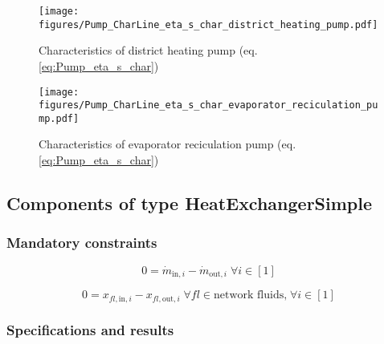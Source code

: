 \begin{minipage}{0.5\textwidth}
\begin{figure}[H]\begin{center}
\texttt{[image: figures/Pump\_CharLine\_eta\_s\_char\_district\_heating\_pump.pdf]}
\caption{Characteristics of district heating pump (eq. \ref{eq:Pump_eta_s_char})}
\label{fig:CharLine_eta_s_char_district heating pump}
\end{center}\end{figure}

\end{minipage}
\begin{minipage}{0.5\textwidth}
\begin{figure}[H]\begin{center}
\texttt{[image: figures/Pump\_CharLine\_eta\_s\_char\_evaporator\_reciculation\_pump.pdf]}
\caption{Characteristics of evaporator reciculation pump (eq. \ref{eq:Pump_eta_s_char})}
\label{fig:CharLine_eta_s_char_evaporator reciculation pump}
\end{center}\end{figure}

\end{minipage}


\subsection{Components of type HeatExchangerSimple}

\subsubsection{Mandatory constraints}

\begin{equation}
\label{eq:HeatExchangerSimple_mass_flow_constraints}
0=\dot{m}_{\mathrm{in,}i}-\dot{m}_{\mathrm{out,}i}\; \forall i \in [1]
\end{equation}

\begin{equation}
\label{eq:HeatExchangerSimple_fluid_constraints}
0=x_{fl\mathrm{,in,}i}-x_{fl\mathrm{,out,}i}\;\forall fl \in\text{network fluids,}\; \forall i \in [1]
\end{equation}


\subsubsection{Specifications and results}

